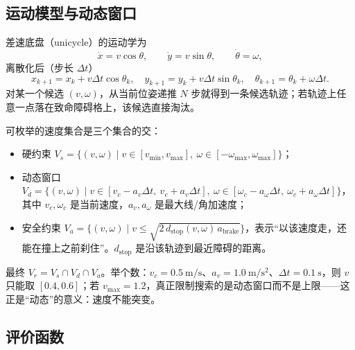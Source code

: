 \subsection{运动模型与动态窗口}

差速底盘（unicycle）的运动学为
\begin{equation}
  \dot x=v\cos\theta,\qquad \dot y=v\sin\theta,\qquad \dot\theta=\omega,
  \label{eq:20-unicycle}
\end{equation}
离散化后（步长 $\Delta t$）
\begin{equation}
  x_{k+1}=x_k+v\Delta t\cos\theta_k,\quad
  y_{k+1}=y_k+v\Delta t\sin\theta_k,\quad
  \theta_{k+1}=\theta_k+\omega\Delta t.
  \label{eq:20-dwa-model}
\end{equation}
对某一个候选 $(v,\omega)$，从当前位姿递推 $N$ 步就得到一条候选轨迹；若轨迹上任意一点落在致命障碍格上，该候选直接淘汰。

可枚举的速度集合是三个集合的交：
\begin{itemize}
  \item 硬约束 $V_s=\{(v,\omega)\mid v\in[v_{\min},v_{\max}],\ \omega\in[-\omega_{\max},\omega_{\max}]\}$；
  \item 动态窗口 $V_d=\{(v,\omega)\mid v\in[v_c-a_v\Delta t,\ v_c+a_v\Delta t],\ \omega\in[\omega_c-a_\omega\Delta t,\ \omega_c+a_\omega\Delta t]\}$，其中 $v_c,\omega_c$ 是当前速度，$a_v,a_\omega$ 是最大线/角加速度；
  \item 安全约束 $V_a=\{(v,\omega)\mid v\le\sqrt{2\,d_{\mathrm{stop}}(v,\omega)\,a_{\mathrm{brake}}}\}$，表示“以该速度走，还能在撞上之前刹住”。$d_{\mathrm{stop}}$ 是沿该轨迹到最近障碍的距离。
\end{itemize}
最终 $V_r=V_s\cap V_d\cap V_a$。举个数：$v_c=0.5\ \mathrm{m/s}$、$a_v=1.0\ \mathrm{m/s^2}$、$\Delta t=0.1\ \mathrm{s}$，则 $v$ 只能取 $[0.4,0.6]$；若 $v_{\max}=1.2$，真正限制搜索的是动态窗口而不是上限——这正是“动态”的意义：速度不能突变。

\subsection{评价函数}

